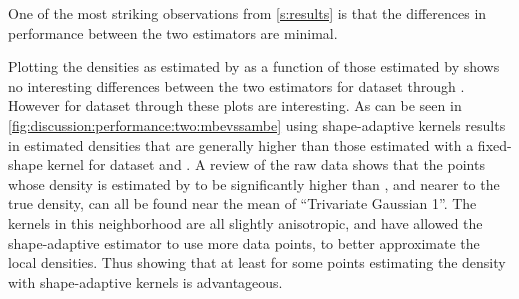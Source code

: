 
One of the most striking observations from \cref{s:results} is that the differences in performance between the two estimators are minimal. 
	
	Plotting the densities as estimated by \sambe as a function of those estimated by \mbe shows no interesting differences between the two estimators for dataset \ferdosiOne through \baakmanFive. 
		However for dataset \ferdosiTwo through \baakmanThree these plots are interesting. As can be seen in \cref{fig:discussion:performance:two:mbevssambe} using shape-adaptive kernels results in estimated densities that are generally higher than those estimated with a fixed-shape kernel for dataset \ferdosiTwo and \baakmanTwo. A review of the raw data shows that the points whose density is estimated by \sambe to be significantly higher than \mbe, and nearer to the true density, can all be found near the mean of ``Trivariate Gaussian 1''. The kernels in this neighborhood are all slightly anisotropic, and have allowed the shape-adaptive estimator to use more data points, to better approximate the local densities. Thus showing that at least for some points estimating the density with shape-adaptive kernels is advantageous.
